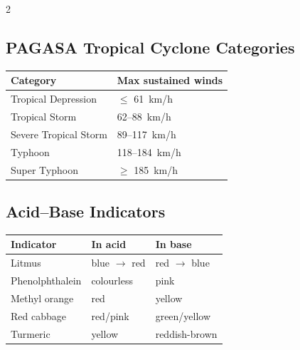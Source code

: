 \begin{multicols}{2}
\subsection*{PAGASA Tropical Cyclone Categories}
\begin{tabular}{@{}p{3.6cm}p{3.6cm}@{}}
\toprule
Category & Max sustained winds\\ \midrule
Tropical Depression & $\le$ \SI{61}{km/h}\\
Tropical Storm & 62--\SI{88}{km/h}\\
Severe Tropical Storm & 89--\SI{117}{km/h}\\
Typhoon & 118--\SI{184}{km/h}\\
Super Typhoon & $\ge$ \SI{185}{km/h}\\ \bottomrule
\end{tabular}

\subsection*{Acid--Base Indicators}
\begin{tabular}{@{}p{2.4cm}p{2.4cm}p{2.8cm}@{}}
\toprule
Indicator & In acid & In base\\ \midrule
Litmus & blue $\rightarrow$ red & red $\rightarrow$ blue\\
Phenolphthalein & colourless & pink\\
Methyl orange & red & yellow\\
Red cabbage & red/pink & green/yellow\\
Turmeric & yellow & reddish-brown\\ \bottomrule
\end{tabular}


\end{multicols}
